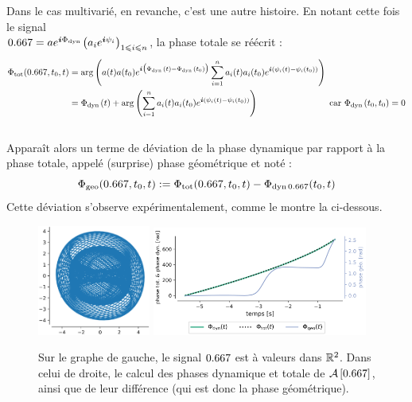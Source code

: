 Dans le cas multivarié, en revanche, c'est une autre histoire. En notant cette fois le signal \\
$\x = ae^{\i \phased} \big( a_ie^{\i \psi_i} \big)_{1\leq i\leq n}$, la phase totale se réécrit :
\begin{equation}\label{eq:diff_phases_t/d}
	\begin{aligned}
		\phaset(\x,t_0, t) &= \arg \left(a(t)a(t_0) e^{\i \big(\phased(t) - \phased(t_0)\big)}\sum_{i=1}^n a_i(t)a_i(t_0)e^{\i (\psi_i(t)-\psi_i(t_0))} \right) \\
		&= \phased(t) + \arg \left(\sum_{i=1}^n a_i(t)a_i(t_0)e^{\i (\psi_i(t)-\psi_i(t_0))} \right)  \qquad\qquad\qquad\qquad \text{car } \phased(t_0,t_0) = 0
	\end{aligned}
\end{equation}
\\
Apparaît alors un terme de déviation de la phase dynamique par rapport à la phase totale, appelé (surprise) phase géométrique et noté :
\begin{equation}\label{eq:phase_g}
	\phaseg(\x,t_0,t) \defeq \phaset(\x, t_0,t) - \phased[\x](t_0,t)
\end{equation}
Cette déviation s'observe expérimentalement, comme le montre la  ci-dessous.
\\
\begin{figure}[h]
	\includegraphics[width=0.33\textwidth]{fig/part-1/exp_GW.png} \hfill
	\includegraphics[width=0.63\textwidth]{fig/part-1/exp_GW_phases.png}
	\caption[ Déviation de la phase dynamique d'un signal bivarié par rapport à sa phase totale]{Sur le graphe de gauche, le signal $\x$ est à valeurs dans $\mathbb{R}^2$. Dans celui de droite, le calcul des phases dynamique et totale de $\SA{\x}$,  ainsi que de leur différence (qui est donc la phase géométrique).}
	\label{fig:calc_diff_phases}
\end{figure}
\\

